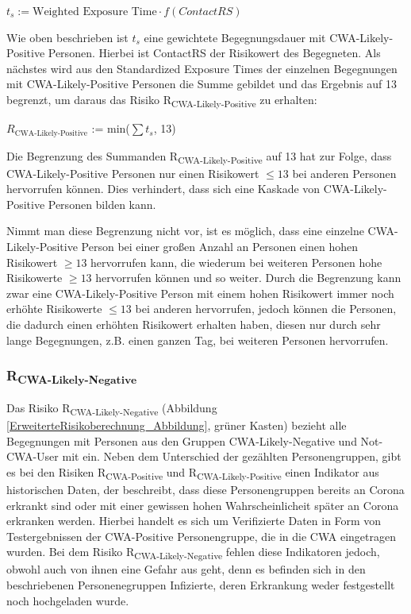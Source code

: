 \documentclass[conference,compsoc]{IEEEtran}
\begin{document}
\centerline{\text{ }}
\centerline{$t_s := \text{Weighted Exposure Time} \cdot f(ContactRS)$}
\centerline{\text{ }}

Wie oben beschrieben ist $t_s$ eine gewichtete Begegnungsdauer mit CWA-Likely-Positive Personen.
Hierbei ist ContactRS der Risikowert des Begegneten.
Als nächstes wird aus den Standardized Exposure Times der einzelnen Begegnungen mit CWA-Likely-Positive Personen die Summe gebildet und das Ergebnis auf 13 begrenzt, 
um daraus das Risiko R\textsubscript{CWA-Likely-Positive} zu erhalten:

\centerline{\text{ }}
\centerline{$R_{\text{CWA-Likely-Positive}}$ := min($\sum t_s$, 13)}
\centerline{\text{ }}

Die Begrenzung des Summanden R\textsubscript{CWA-Likely-Positive} auf 13 hat zur Folge, 
dass CWA-Likely-Positive Personen nur einen Risikowert $\le 13$ bei anderen Personen hervorrufen können. 
Dies verhindert, dass sich eine Kaskade von CWA-Likely-Positive Personen bilden kann. 

Nimmt man diese Begrenzung nicht vor, ist es möglich, 
dass eine einzelne CWA-Likely-Positive Person bei einer großen Anzahl an Personen einen hohen Risikowert $\geq 13$ hervorrufen kann, 
die wiederum bei weiteren Personen hohe Risikowerte $\geq 13$ hervorrufen können und so weiter. 
Durch die Begrenzung kann zwar eine CWA-Likely-Positive Person mit einem hohen Risikowert immer noch erhöhte Risikowerte $\leq 13$ bei anderen hervorrufen, 
jedoch können die Personen, die dadurch einen erhöhten Risikowert erhalten haben, 
diesen nur durch sehr lange Begegnungen, z.B. einen ganzen Tag, bei weiteren Personen hervorrufen.\\

\subsubsection{R\textsubscript{CWA-Likely-Negative}}
\label{CWALikelyNegative}

Das Risiko R\textsubscript{CWA-Likely-Negative} (Abbildung \ref{ErweiterteRisikoberechnung_Abbildung}, grüner Kasten) 
bezieht alle Begegnungen mit Personen aus den Gruppen CWA-Likely-Negative und Not-CWA-User mit ein.
Neben dem Unterschied der gezählten Personengruppen, gibt es bei den  Risiken R\textsubscript{CWA-Positive} und 
R\textsubscript{CWA-Likely-Positive} einen Indikator aus historischen Daten, 
der beschreibt, dass diese Personengruppen bereits an Corona erkrankt sind oder mit einer gewissen hohen Wahrscheinlicheit später an Corona erkranken werden. 
Hierbei handelt es sich um Verifizierte Daten in Form von Testergebnissen der CWA-Positive Personengruppe, die in die CWA eingetragen wurden.
Bei dem Risiko R\textsubscript{CWA-Likely-Negative} fehlen diese Indikatoren jedoch, obwohl auch von ihnen eine Gefahr aus geht,
denn es befinden sich in den beschriebenen Personenegruppen Infizierte, deren Erkrankung weder festgestellt noch hochgeladen wurde.
\end{document}
